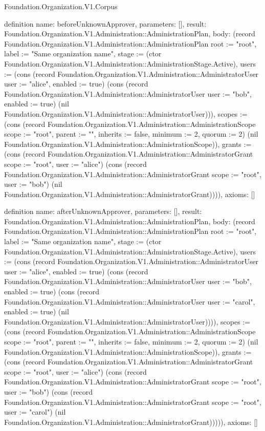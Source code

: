\begin{lexlean}{Foundation.Organization.V1.Corpus}
\begin{semanticmodule}
definition{
  name: beforeUnknownApprover,
  parameters: [],
  result: Foundation.Organization.V1.Administration::AdministrationPlan,
  body: (record Foundation.Organization.V1.Administration::AdministrationPlan {root := "root", label := "Same organization name", stage := (ctor Foundation.Organization.V1.Administration::AdministrationStage.Active), users := (cons (record Foundation.Organization.V1.Administration::AdministratorUser {user := "alice", enabled := true}) (cons (record Foundation.Organization.V1.Administration::AdministratorUser {user := "bob", enabled := true}) (nil Foundation.Organization.V1.Administration::AdministratorUser))), scopes := (cons (record Foundation.Organization.V1.Administration::AdministrationScope {scope := "root", parent := "", inherits := false, minimum := 2, quorum := 2}) (nil Foundation.Organization.V1.Administration::AdministrationScope)), grants := (cons (record Foundation.Organization.V1.Administration::AdministratorGrant {scope := "root", user := "alice"}) (cons (record Foundation.Organization.V1.Administration::AdministratorGrant {scope := "root", user := "bob"}) (nil Foundation.Organization.V1.Administration::AdministratorGrant)))}),
  axioms: []
}

definition{
  name: afterUnknownApprover,
  parameters: [],
  result: Foundation.Organization.V1.Administration::AdministrationPlan,
  body: (record Foundation.Organization.V1.Administration::AdministrationPlan {root := "root", label := "Same organization name", stage := (ctor Foundation.Organization.V1.Administration::AdministrationStage.Active), users := (cons (record Foundation.Organization.V1.Administration::AdministratorUser {user := "alice", enabled := true}) (cons (record Foundation.Organization.V1.Administration::AdministratorUser {user := "bob", enabled := true}) (cons (record Foundation.Organization.V1.Administration::AdministratorUser {user := "carol", enabled := true}) (nil Foundation.Organization.V1.Administration::AdministratorUser)))), scopes := (cons (record Foundation.Organization.V1.Administration::AdministrationScope {scope := "root", parent := "", inherits := false, minimum := 2, quorum := 2}) (nil Foundation.Organization.V1.Administration::AdministrationScope)), grants := (cons (record Foundation.Organization.V1.Administration::AdministratorGrant {scope := "root", user := "alice"}) (cons (record Foundation.Organization.V1.Administration::AdministratorGrant {scope := "root", user := "bob"}) (cons (record Foundation.Organization.V1.Administration::AdministratorGrant {scope := "root", user := "carol"}) (nil Foundation.Organization.V1.Administration::AdministratorGrant))))}),
  axioms: []
}


\end{semanticmodule}
\end{lexlean}
